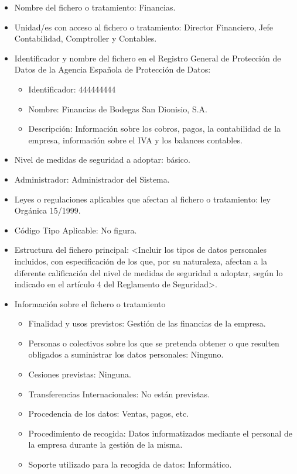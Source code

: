 \documentclass[a4paper,11pt,bibtotoc,noliststotoc]{scrbook}
\newcommand{\laorganizacion}{Bodegas San Dionisio, S.A.}
\begin{document}
\begin{itemize}
\item Nombre del fichero o tratamiento: Financias.

\item Unidad/es con acceso al fichero o tratamiento: Director Financiero, Jefe Contabilidad, Comptroller y Contables.

\item Identificador y nombre del fichero en el Registro General de Protección de Datos de la Agencia Española de Protección de Datos: 
	\begin{itemize}
	\item Identificador: 444444444
	\item Nombre: Financias de \laorganizacion
	\item Descripción: Información sobre los cobros, pagos, la contabilidad de la empresa, información sobre el IVA y los balances contables.
	\end{itemize}

\item Nivel de medidas de seguridad a adoptar: básico.

\item Administrador: Administrador del Sistema.

\item Leyes o regulaciones aplicables que afectan al fichero o tratamiento: ley Orgánica 15/1999.

\item Código Tipo Aplicable: No figura.

\item Estructura del fichero principal: <Incluir los tipos de datos personales incluidos, con especificación de los que, por su naturaleza, afectan a la diferente calificación del nivel de medidas de seguridad a adoptar, según lo indicado en el artículo 4 del Reglamento de Seguridad>.

\item Información sobre el fichero o tratamiento
	\begin{itemize}
	\item Finalidad y usos previstos: Gestión de las financias de la empresa.
	\item Personas o colectivos sobre los que se pretenda obtener o que resulten obligados a suministrar los datos personales: Ninguno.
	\item Cesiones previstas: Ninguna.
	\item Transferencias Internacionales: No están previstas.
	\item Procedencia de los datos: Ventas, pagos, etc.
	\item Procedimiento de recogida: Datos informatizados mediante el personal de la empresa durante la gestión de la misma.
	\item Soporte utilizado para la recogida de datos: Informático.
	\end{itemize}


\end{itemize}
\end{document}
